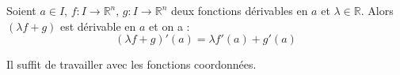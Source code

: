 \documentclass[french,11pt,twoside]{VcCours}
\begin{document}
\begin{Proposition}{} Soient $a \in I$, $f : I \rightarrow \mathbb{R}^n$, $g : I \rightarrow \mathbb{R}^n$ deux fonctions dérivables en $a$ et $\lambda \in \mathbb{R}$. Alors $(\lambda f+g)$ est dérivable en $a$ et on a :
$$ (\lambda f+g)'(a) = \lambda f'(a) + g'(a) $$
\end{Proposition}

\begin{Demonstration}{} Il suffit de travailler avec les fonctions coordonnées.
\end{Demonstration}

%

\end{document}
